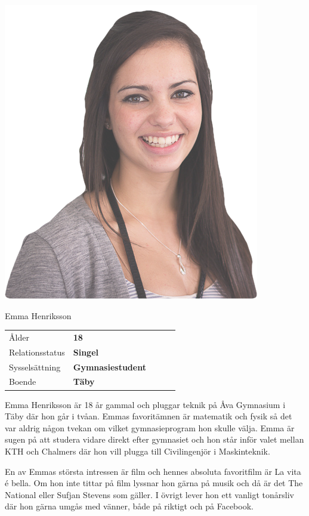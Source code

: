 \includegraphics[scale=0.5]{persona2.png}\\

\vspace{50px}

{\fontsize{1cm}{1em}\selectfont Emma Henriksson}

\vspace{20px}

\begin{tabular}{lllll}
  Ålder & \textbf{18} \\
  Relationsstatus & \textbf{Singel} \\
  Sysselsättning & \textbf{Gymnasiestudent}\\
  Boende & \textbf{Täby} \\
\end{tabular}

\vspace{20px}
Emma Henriksson är 18 år gammal och pluggar teknik på Åva Gymnasium i Täby där hon går i tvåan. Emmas favoritämnen är matematik och fysik så det var aldrig någon tvekan om vilket gymnasieprogram hon skulle välja. Emma är sugen på att studera vidare direkt efter gymnasiet och hon står inför valet mellan KTH och Chalmers där hon vill plugga till Civilingenjör i Maskinteknik.

En av Emmas största intressen är film och hennes absoluta favoritfilm är La vita é bella. Om hon inte tittar på film lyssnar hon gärna på musik och då är det The National eller Sufjan Stevens som gäller. I övrigt lever hon ett vanligt tonårsliv där hon gärna umgås med vänner, både på riktigt och på Facebook.


